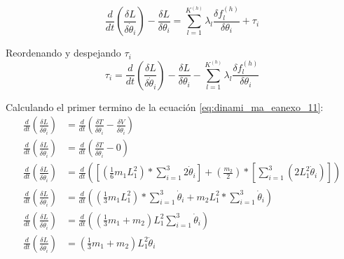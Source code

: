              \[ \frac{d}{dt} \left( \frac{ \delta L}{ \delta \dot{ \theta }_{i}} \right) -\frac{ \delta L}{ \delta  \theta _{i}}= \sum _{l=1}^{K^{ \left( h \right) }} \lambda _{l}\frac{ \delta f_{l}^{ \left( h \right) }}{ \delta  \theta _{i}}+ \tau_{i} \] 
            
            Reordenando y despejando $\tau_i$
            \begin{equation}
                 \tau_{i}=\frac{d}{dt} \left( \frac{ \delta L}{ \delta \dot{ \theta }_{i}} \right) -\frac{ \delta L}{ \delta  \theta _{i}}- \sum _{l=1}^{K^{ \left( h \right) }} \lambda _{l}\frac{ \delta f_{l}^{ \left( h \right) }}{ \delta  \theta _{i}}
                 \label{eq:dinami_ma_eanexo_11}
            \end{equation}
            
            Calculando el primer termino de la ecuación \ref{eq:dinami_ma_eanexo_11}:
            \begin{align*}
              \frac{d}{dt} \left( \frac{ \delta L}{ \delta \dot{ \theta }_{i}} \right) &=\frac{d}{dt} \left( \frac{ \delta T}{ \delta \dot{ \theta }_{i}}-\frac{ \delta V}{ \delta \dot{ \theta }_{i}} \right)   \\
              \frac{d}{dt} \left( \frac{ \delta L}{ \delta \dot{ \theta }_{i}} \right) &=\frac{d}{dt} \left( \frac{ \delta T}{ \delta \dot{ \theta }_{i}}-0 \right)   \\
              \frac{d}{dt} \left( \frac{ \delta L}{ \delta \dot{ \theta }_{i}} \right) &=\frac{d}{dt} \left(  \left[  \left( \frac{1}{6}m_{1}L_{1}^{2} \right) \ast \sum _{i=1}^{3}2\dot{ \theta }_{i} \right] + \left( \frac{m_{2}}{2} \right) \ast \left[  \sum _{i=1}^{3} \left( 2L_{1}^{2}\dot{ \theta }_{i} \right)  \right]  \right)   \\
              \frac{d}{dt} \left( \frac{ \delta L}{ \delta \dot{ \theta }_{i}} \right) &=\frac{d}{dt} \left(  \left( \frac{1}{3}m_{1}L_{1}^{2} \right) \ast \sum _{i=1}^{3}\dot{ \theta }_{i}+m_{2}L_{1}^{2}\ast \sum _{i=1}^{3}\dot{ \theta }_{i} \right)   \\
              \frac{d}{dt} \left( \frac{ \delta L}{ \delta \dot{ \theta }_{i}} \right) &=\frac{d}{dt} \left(  \left( \frac{1}{3}m_{1}+m_{2} \right) L_{1}^{2} \sum _{i=1}^{3}\dot{ \theta }_{i} \right)   \\
              \frac{d}{dt} \left( \frac{ \delta L}{ \delta \dot{ \theta }_{i}} \right) &= \left( \frac{1}{3}m_{1}+m_{2} \right) L_{1}^{2}\ddot{ \theta }_{i}
            \end{align*}
            
